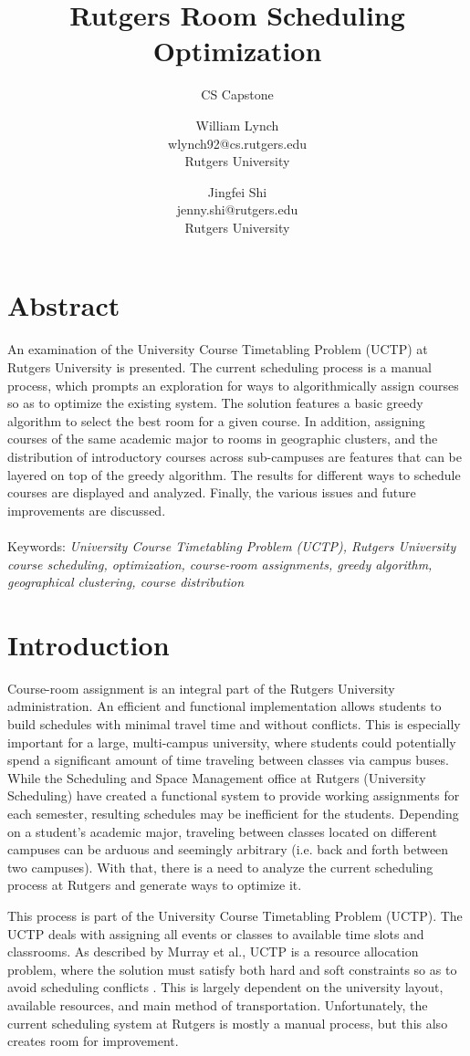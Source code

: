 \documentclass{acm_proc_article-sp}
\title{Rutgers Room Scheduling Optimization}
\subtitle{CS Capstone}
\author {William Lynch \\ wlynch92@cs.rutgers.edu \\ Rutgers University
	\and Jingfei Shi \\ jenny.shi@rutgers.edu \\ Rutgers University
}
\begin{document}
\maketitle
\section{Abstract}
An examination of the University Course Timetabling Problem (UCTP) at Rutgers
University is presented. The current scheduling process is a manual process,
which prompts an exploration for ways to algorithmically assign courses so as
to optimize the existing system. The solution features a basic greedy algorithm
to select the best room for a given course. In addition, assigning courses of
the same academic major to rooms in geographic clusters, and the distribution
of introductory courses across sub-campuses are features that can be layered on
top of the greedy algorithm. The results for different ways to schedule courses
are displayed and analyzed. Finally, the various issues and future improvements
are discussed.
\\\\
Keywords: \emph{University Course Timetabling Problem (UCTP), Rutgers University
course scheduling, optimization, course-room assignments, greedy algorithm,
geographical clustering, course distribution}

\section{Introduction}
	Course-room assignment is an integral part of the Rutgers University
	administration. An efficient and functional implementation allows students to
	build schedules with minimal travel time and without conflicts. This is
	especially important for a large, multi-campus university, where students could
	potentially spend a significant amount of time traveling between classes via
	campus buses. While the Scheduling and Space Management office at Rutgers
	(University Scheduling) have created a functional system to provide working
	assignments for each semester, resulting schedules may be inefficient for the
	students. Depending on a student's academic major, traveling between classes
	located on different campuses can be arduous and seemingly arbitrary (i.e. back
	and forth between two campuses). With that, there is a need to analyze the
	current scheduling process at Rutgers and generate ways to optimize it.

	This process is part of the University Course Timetabling Problem (UCTP). The
	UCTP deals with assigning all events or classes to available time slots and
	classrooms. As described by Murray et al., UCTP is a resource allocation
	problem, where the solution must satisfy both hard and soft constraints so as
	to avoid scheduling conflicts \cite{citation1}. This is largely dependent on the university
	layout, available resources, and main method of transportation. Unfortunately,
	the current scheduling system at Rutgers is mostly a manual process, but this
	also creates room for improvement. 
\end{document}
